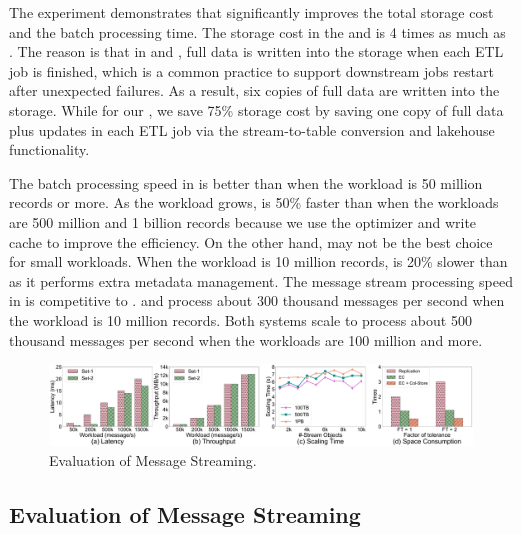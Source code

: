 The experiment demonstrates that \sys significantly improves the total storage cost and the batch processing time. The storage cost in the \hdfs and \kafka  is 4 times as much as \sys. The reason is that in \hdfs and \kafka, full data is written into the storage when each ETL job is finished, which is a common practice to support downstream jobs restart after unexpected failures. As a result, six copies of full data are written into the storage. 
While for our \sys, we save 75\%  storage cost by saving one copy of full data plus updates in each ETL job via the stream-to-table conversion and lakehouse functionality.

The batch processing speed in \sys is better than \hdfs when the workload is 50 million records or more.  As the workload grows,  \sys is 50\% faster than \hdfs when the workloads are 500 million and 1 billion records because we use the \brain optimizer and  write cache to improve the efficiency.
 On the other hand, \sys may not be the best choice for small workloads. When the workload is 10 million records, \sys is 20\% slower than \hdfs as it performs extra metadata management.
The message stream processing speed in \sys is competitive to \kafka. \sys and \kafka process about 300 thousand messages per second when the workload is 10 million records. Both systems scale to process about 500 thousand messages per second when the workloads are 100 million and more. 


\begin{figure}
	\centering
	\includegraphics[width=\textwidth]{figures/streamengine}
	\vspace{-2em}
	\caption{Evaluation of Message Streaming.}
	\label{fig:streamengine}
	\vspace{-2em}
\end{figure}



\subsection{Evaluation of Message Streaming}

